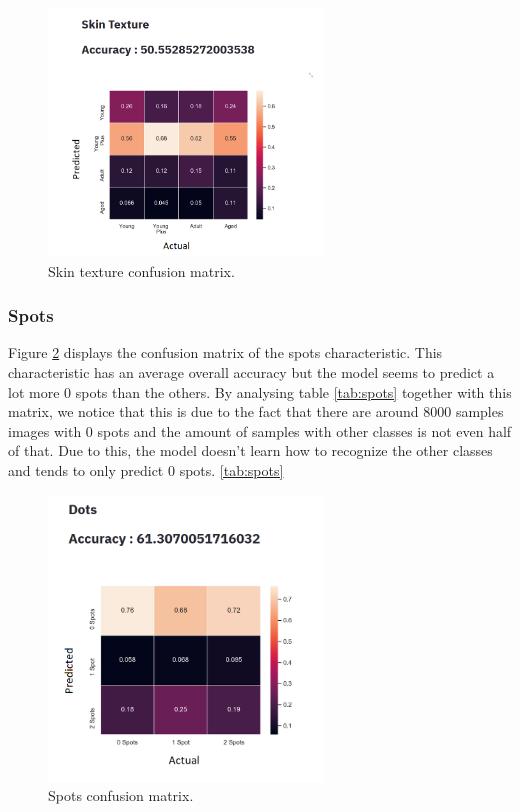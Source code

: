 \documentclass[12pt,a4paper,oneside]{memoir}
\begin{document}
\begin{figure}[H]
\centering 
\includegraphics[width=0.65\textwidth]{images/skin_lock_texture.png}
\caption{Skin texture confusion matrix.}
\centering
\label{fig:skin_lock_texture}
\end{figure}

\subsubsection{Spots}
Figure \ref{fig:spots_lock} displays the confusion matrix of the spots characteristic. This 
characteristic has an average overall accuracy but the model seems to predict a lot more 0 spots than the others. By analysing table \ref{tab:spots} together with this matrix, we notice that this is due to the fact that there are around 8000 samples images with 0 spots and the amount of samples with other classes is not even half of that. Due to this, the model doesn't learn how to recognize the other classes and tends to only predict 0 spots.
\ref{tab:spots}

\begin{figure}[H]
\centering
\includegraphics[width=0.65\textwidth]{images/dots_lock.png}
\caption{Spots confusion matrix.}
\centering
\label{fig:spots_lock}
\end{figure}
\end{document}
